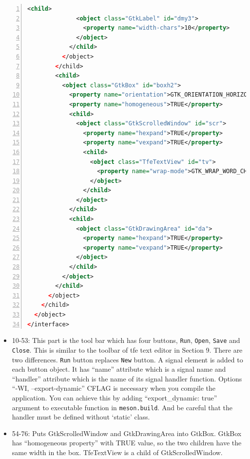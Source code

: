 \begin{lstlisting}[language=XML, numbers=left]
            <child>
              <object class="GtkLabel" id="dmy3">
                <property name="width-chars">10</property>
              </object>
            </child>
          </object>
        </child>
        <child>
          <object class="GtkBox" id="boxh2">
            <property name="orientation">GTK_ORIENTATION_HORIZONTAL</property>
            <property name="homogeneous">TRUE</property>
            <child>
              <object class="GtkScrolledWindow" id="scr">
                <property name="hexpand">TRUE</property>
                <property name="vexpand">TRUE</property>
                <child>
                  <object class="TfeTextView" id="tv">
                    <property name="wrap-mode">GTK_WRAP_WORD_CHAR</property>
                  </object>
                </child>
              </object>
            </child>
            <child>
              <object class="GtkDrawingArea" id="da">
                <property name="hexpand">TRUE</property>
                <property name="vexpand">TRUE</property>
              </object>
            </child>
          </object>
        </child>
      </object>
    </child>
  </object>
</interface>
\end{lstlisting}

\begin{itemize}
\tightlist
\item
  10-53: This part is the tool bar which has four buttons,
  \passthrough{\lstinline!Run!}, \passthrough{\lstinline!Open!},
  \passthrough{\lstinline!Save!} and \passthrough{\lstinline!Close!}.
  This is similar to the toolbar of tfe text editor in Section 9. There
  are two differences. \passthrough{\lstinline!Run!} button replaces
  \passthrough{\lstinline!New!} button. A signal element is added to
  each button object. It has ``name'' attribute which is a signal name
  and ``handler'' attribute which is the name of its signal handler
  function. Options ``-WI, --export-dynamic'' CFLAG is necessary when
  you compile the application. You can achieve this by adding
  ``export\_dynamic: true'' argument to executable function in
  \passthrough{\lstinline!meson.build!}. And be careful that the handler
  must be defined without `static' class.
\item
  54-76: Puts GtkScrolledWindow and GtkDrawingArea into GtkBox. GtkBox
  has ``homogeneous property'' with TRUE value, so the two children have
  the same width in the box. TfeTextView is a child of
  GtkScrolledWindow.
\end{itemize}

